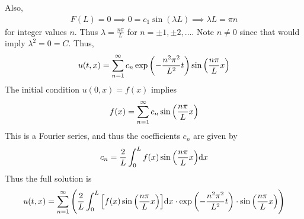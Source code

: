 \documentclass[12pt]{article}
\theoremstyle{plain}
\begin{document}
Also,
\begin{align*}
    F(L) = 0 \implies 0 = c_1 \sin(\lambda L) \implies \lambda L = \pi n
\end{align*}
for integer values $n$.  Thus $\lambda = \frac{n\pi}{L}$ for $n = \pm 1, \pm 2, \dots$.  Note $n \neq 0$ since that would imply $\lambda^2 = 0 = C$.  Thus,
\begin{align*}
    u(t,x) = \sum_{n=1}^\infty c_n \exp\qty(-\frac{n^2 \pi^2}{L^2}t)\sin\qty(\frac{n\pi}{L}x)
\end{align*}
The initial condition $u(0,x) = f(x)$ implies
\begin{align*}
    f(x) = \sum_{n=1}^\infty c_n\sin\qty(\frac{n\pi}{L}x)
\end{align*}
This is a Fourier series, and thus the coefficients $c_n$ are given by
\begin{align*}
    c_n = \frac{2}{L}\int_0^L f(x) \sin\qty(\frac{n\pi}{L}x)\dd x
\end{align*}
Thus the full solution is
\begin{align*}
    u(t,x) = \sum_{n=1}^\infty \qty(\frac{2}{L}\int_0^L \qty[f(x) \sin\qty(\frac{n\pi}{L}x)]\dd x \cdot \exp\qty(-\frac{n^2 \pi^2}{L^2}t)\cdot\sin\qty(\frac{n\pi}{L}x))
\end{align*}
\end{document}
